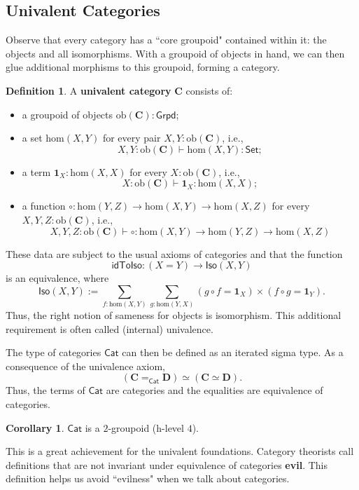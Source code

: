 \documentclass{amsart}
\theoremstyle{definition}
\newtheorem{defn}{Definition}[section]
\newtheorem*{cor}{Corollary}
\newcommand{\Set}{\ensuremath{\mathsf{Set}}}
\newcommand{\Cat}{\ensuremath{\mathsf{Cat}}}
\newcommand{\idToIso}{\ensuremath{\mathsf{idToIso}}}
\newcommand{\Iso}{\ensuremath{\mathsf{Iso}}}
\newcommand{\Grpd}{\ensuremath{\mathsf{Grpd}}}
\newcommand{\ob}[1]{\ensuremath{\mathrm{ob}{(\cat{#1})}}}
\newcommand{\cHom}[2]{\ensuremath{\mathrm{hom}(#1,#2)}}
\newcommand{\cId}{\ensuremath{\mathbf{1}}}
\newcommand{\cat}[1]{\ensuremath{\mathbf{#1}}}
\renewcommand{\emph}{\textbf}
\begin{document}
\subsection{Univalent Categories}\label{sec:univalent-categories}
Observe that every category has a ``core groupoid" contained within it: the objects and all isomorphisms.
With a groupoid of objects in hand, we can then glue additional morphisms to this groupoid, forming a category.
\begin{defn}
    A \emph{univalent category} $\cat{C}$ consists of:
\begin{itemize}
    \item a groupoid of objects $\ob{C} : \Grpd$;
    \item a set $\cHom{X}{Y}$ for every pair $X,Y : \ob{C}$, i.e., $$X,Y : \ob{C} \vdash \cHom{X}{Y} : \Set;$$
    \item a term $\cId_{X} : \cHom{X}{X}$ for every $X : \ob{C}$, i.e., $$X:\ob{C} \vdash \cId_{X} : \cHom{X}{X};$$
    \item a function $\circ: \cHom{Y}{Z} \to \cHom{X}{Y} \to \cHom{X}{Z}$ for every $X,Y,Z : \ob{C}$, i.e., $$X,Y,Z: \ob{C} \vdash \circ : \cHom{X}{Y} \to \cHom{Y}{Z}\to \cHom{X}{Z}$$
\end{itemize}
These data are subject to the usual axioms of categories and that the function
\[
    \idToIso: (X=Y) \to \Iso(X,Y)
\]
is an equivalence, where 
$$\Iso(X,Y) := \sum_{f:\cHom{X}{Y}} \sum_{g:\cHom{Y}{X}} (g\circ f = \cId_{X}) \times (f \circ g = \cId_{Y}).$$
Thus, the right notion of sameness for objects is isomorphism.
This additional requirement is often called (internal) univalence.
\end{defn}
The type of categories $\Cat$ can then be defined as an iterated sigma type.
As a consequence of the univalence axiom,
\[
    (\cat{C} =_{\Cat} \cat{D}) \simeq (\cat{C} \simeq \cat{D}).
\]
Thus, the terms of $\Cat$ are categories and the equalities are equivalence of categories.
\begin{cor}
    $\Cat$ is a $2$-groupoid (h-level $4$).
\end{cor}
This is a great achievement for the univalent foundations.
Category theorists call definitions that are not invariant under equivalence of categories \emph{evil}.
This definition helps us avoid ``evilness" when we talk about categories.

\end{document}
